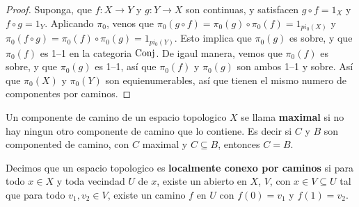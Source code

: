\begin{proof}
    Suponga, que $f:X \xrightarrow{} Y$ y $g:Y \xrightarrow{} X$ son continuas,
    y satisfacen $g \circ f=1_X$ y  $f \circ g=1_Y$. Aplicando  $\pi_0$, venos
    que $\pi_0(g \circ f)=\pi_0(g) \circ \pi_0(f)=1_{pi_0(X)}$ y
    $\pi_0(f \circ g)=\pi_0(f) \circ \pi_0(g)=1_{pi_0(Y)}$. Esto implica que
    $\pi_0(g)$ es sobre, y que $\pi_0(f)$ es 1--1 en la categoria $\operatorname{Conj}$. De
    igaul manera, vemos que $\pi_0(f)$ es sobre, y que $\pi_0(g)$ es 1--1, as\'i
    que $\pi_0(f)$ y $\pi_0(g)$ son ambos 1--1 y sobre. As\'i que $\pi_0(X)$ y
    $\pi_0(Y)$ son equienumerables, as\'i que tienen el mismo numero de
    componentes por caminos.
\end{proof}

\begin{definition}
    Un componente de camino de un espacio topologico $X$ se llama
    \textbf{maximal} si no hay ningun otro componente de camino que lo contiene.
    Es decir si $C$ y  $B$ son componented de camino, con $C$ maximal y $C
    \subseteq B$, entonces  $C=B$.
\end{definition}

\begin{definition}
    Decimos que un espacio topologico es \textbf{localmente conexo por caminos}
    si para todo $x \in X$ y toda vecindad $U$ de $x$, existe un abierto en $X$,
    $V$, con $x \in V \subseteq U$ tal que para todo $v_1,v_2 \in V$, existe un
    camino $f$ en $U$ con $f(0)=v_1$ y $f(1)=v_2$.
\end{definition}

